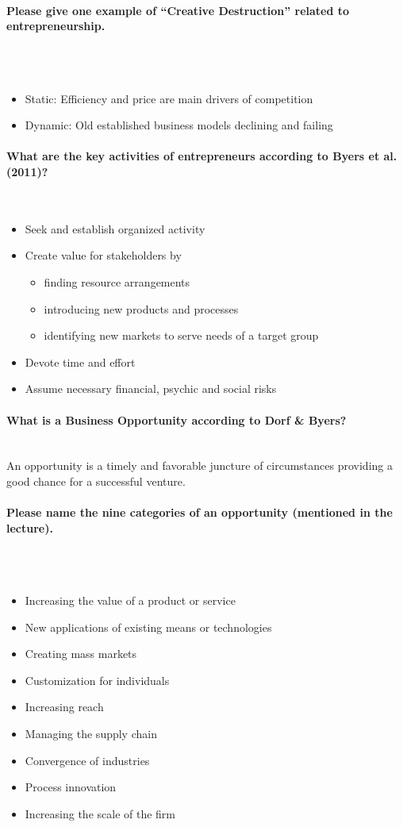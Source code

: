 \documentclass[10pt,a4paper,noendnumber=true]{scrartcl}
\newcommand{\properparagraph}[1]{\paragraph{\textcolor{Emerald}{#1}}\mbox{}\\}
\begin{document}
\properparagraph{Please give one example of “Creative Destruction” related to entrepreneurship.}
\\[-6ex]
\begin{itemize}
	\item Static: Efficiency and price are main drivers of competition
	\item Dynamic: Old established business models declining and failing	
\end{itemize}

\properparagraph{What are the key activities of entrepreneurs according to Byers et al. (2011)?}
\begin{itemize}
	\item Seek and establish organized activity
	\item Create value for stakeholders by
	\begin{itemize}
		\item finding resource arrangements
		\item introducing new products and processes
		\item identifying new markets to serve needs of a target group
	\end{itemize}
	\item Devote time and effort
	\item Assume necessary financial, psychic and social risks
\end{itemize}


\properparagraph{What is a Business Opportunity according to Dorf \& Byers?}
An opportunity is a timely and favorable juncture of circumstances providing a good chance for a successful venture.

\properparagraph{Please name the nine categories of an opportunity (mentioned in the lecture).}
\\[-6ex]
\begin{itemize}
	\item Increasing the value of a product or service
	\item New applications of existing means or technologies
	\item Creating mass markets
	\item Customization for individuals
	\item Increasing reach
	\item Managing the supply chain
	\item Convergence of industries
	\item Process innovation
	\item Increasing the scale of the firm
\end{itemize}
\end{document}

